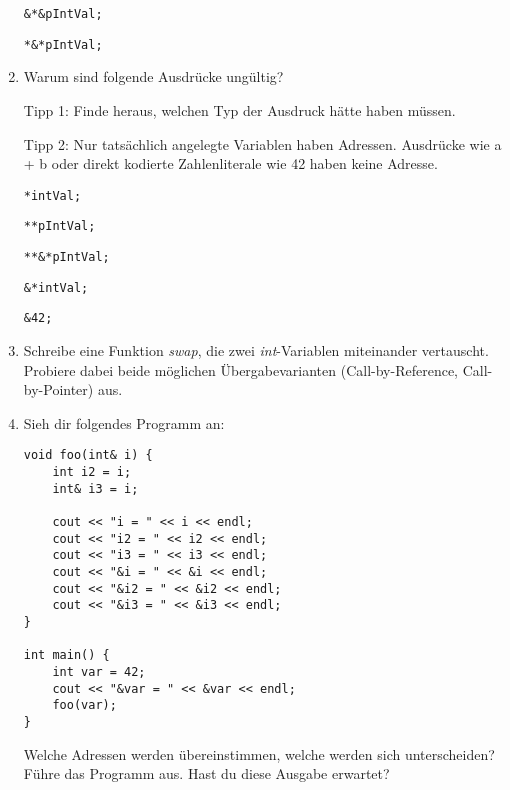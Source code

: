 \documentclass[
  accentcolor=tud1c,	%
  colorbacktitle,		%
  inverttitle,			%
  german,				%
  twoside
]{tudexercise}
\begin{document}
\begin{enumerate}
\begin{lstlisting}
&*&pIntVal;
\end{lstlisting}

\begin{lstlisting}
*&*pIntVal;
\end{lstlisting}


\item Warum sind folgende Ausdrücke ungültig?

Tipp 1: Finde heraus, welchen Typ der Ausdruck hätte haben müssen.

Tipp 2: Nur tatsächlich angelegte Variablen haben Adressen. Ausdrücke wie a + b oder direkt kodierte Zahlenliterale wie 42 haben keine Adresse.

\begin{lstlisting}
*intVal;
\end{lstlisting}

\begin{lstlisting}
**pIntVal;
\end{lstlisting}

\begin{lstlisting}
**&*pIntVal;
\end{lstlisting}

\begin{lstlisting}
&*intVal;
\end{lstlisting}

\begin{lstlisting}
&42;
\end{lstlisting}

\item Schreibe eine Funktion \emph{swap}, die zwei \emph{int}-Variablen miteinander vertauscht. 
Probiere dabei beide möglichen Übergabevarianten (Call-by-Reference, Call-by-Pointer) aus. 

\item Sieh dir folgendes Programm an:

\begin{minipage}{\textwidth}
\begin{lstlisting}
void foo(int& i) {
	int i2 = i;
	int& i3 = i;
	
	cout << "i = " << i << endl;
	cout << "i2 = " << i2 << endl;
	cout << "i3 = " << i3 << endl;
	cout << "&i = " << &i << endl;
	cout << "&i2 = " << &i2 << endl;
	cout << "&i3 = " << &i3 << endl;
}

int main() {
	int var = 42;
	cout << "&var = " << &var << endl;
	foo(var);
}
\end{lstlisting}
\end{minipage}

Welche Adressen werden übereinstimmen, welche werden sich unterscheiden?
Führe das Programm aus.
Hast du diese Ausgabe erwartet?

\end{enumerate}
\end{document}
